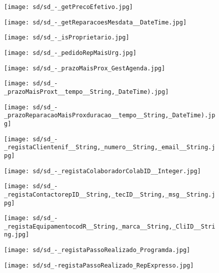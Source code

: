 \documentclass[relatorio.tex]{subfiles}
\begin{document}
\begin{landscape}
\begin{figure} \centering \texttt{[image: sd/sd\_-\_getPrecoEfetivo.jpg]} \end{figure}
\begin{figure} \centering \texttt{[image: sd/sd\_-\_getReparacoesMesdata\_\_DateTime.jpg]} \end{figure}
\begin{figure} \centering \texttt{[image: sd/sd\_-\_isProprietario.jpg]} \end{figure}
\begin{figure} \centering \texttt{[image: sd/sd\_-\_pedidoRepMaisUrg.jpg]} \end{figure}
\begin{figure} \centering \texttt{[image: sd/sd\_-\_prazoMaisProx\_GestAgenda.jpg]} \end{figure}
\begin{figure} \centering \texttt{[image: sd/sd\_-\_prazoMaisProxt\_\_tempo\_\_String,\_DateTime).jpg]} \end{figure}
\begin{figure} \centering \texttt{[image: sd/sd\_-\_prazoReparacaoMaisProxduracao\_\_tempo\_\_String,\_DateTime).jpg]} \end{figure}
\begin{figure} \centering \texttt{[image: sd/sd\_-\_registaClientenif\_\_String,\_numero\_\_String,\_email\_\_String.jpg]} \end{figure}
\begin{figure} \centering \texttt{[image: sd/sd\_-\_registaColaboradorColabID\_\_Integer.jpg]} \end{figure}
\begin{figure} \centering \texttt{[image: sd/sd\_-\_registaContactorepID\_\_String,\_tecID\_\_String,\_msg\_\_String.jpg]} \end{figure}
\begin{figure} \centering \texttt{[image: sd/sd\_-\_registaEquipamentocodR\_\_String,\_marca\_\_String,\_CliID\_\_String.jpg]} \end{figure}
\begin{figure} \centering \texttt{[image: sd/sd\_-\_registaPassoRealizado\_Programda.jpg]} \end{figure}
\begin{figure} \centering \texttt{[image: sd/sd\_-registaPassoRealizado\_RepExpresso.jpg]} \end{figure}

\end{landscape}
\end{document}
